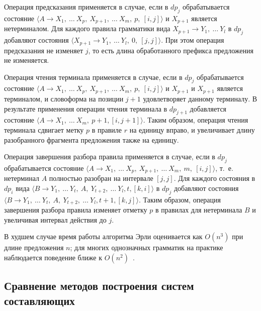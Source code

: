 Операция предсказания применяется в случае, если в $dp_j$ обрабатывается состояние $\langle A \rightarrow X_1,\ \ldots\ X_p,\ X_{p+1},\ \ldots\ X_m,\ p,\ [i, j]\rangle$ и $X_{p+1}$ является нетерминалом. Для каждого правила грамматики вида $X_{p+1} \rightarrow Y_1,\ \ldots\ Y_l$ в $dp_j$ добавляют состояния $\langle X_{p+1} \rightarrow Y_1,\ \ldots\ Y_l,\ 0,\ [j, j]\rangle$. При этом операция предсказания не изменяет $j$, то есть длина обработанного префикса предложения не изменяется.

Операция чтения терминала применяется в случае, если в $dp_j$ обрабатывается состояние $\langle A \rightarrow X_1,\ \ldots\ X_p,\ X_{p+1},\ \ldots\ X_m,\ p,\ [i, j]\rangle$ и $X_{p+1}$ и $X_{p+1}$ является терминалом, и словоформа на позиции $j+1$ удовлетворяет данному терминалу. В результате применения операции чтения терминала в $dp_{j+1}$ добавляется состояние $\langle A \rightarrow X_1,\ \ldots\ X_m,\ p+1, [i, j+1]\rangle$. Таким образом, операция чтения терминала сдвигает метку $p$ в правиле $r$ на единицу вправо, и увеличивает длину разобранного фрагмента предложения также на единицу.

Операция завершения разбора правила применяется в случае, если в $dp_j$ обрабатывается состояние $\langle A \rightarrow X_1,\ \ldots\ X_p,\ X_{p+1},\ \ldots\ X_m,\ m,\ [i, j]\rangle$, т.~е. нетерминал $A$ полностью разобран на интервале $[j, j]$. Для каждого состояния в $dp_i$ вида $\langle B \rightarrow Y_1,\ \ldots\ Y_{t},\ A,\ Y_{t+2},\ \ldots\ Y_l, t, [k, i] \rangle$ в $dp_j$ добавляют состояния $\langle B \rightarrow Y_1,\ \ldots\ Y_{t},\ A,\ Y_{t+2},\ \ldots\ Y_l, t+1, [k, j] \rangle$. Таким образом, операция завершения разбора правила изменяет отметку $p$ в правилах для нетерминала $B$ и увеличивая интервал действия до $j$.

В худшем случае время работы алгоритма Эрли оценивается как $O(n^3)$ при длине предложения $n$; для многих однозначных грамматик на практике наблюдается поведение ближе к $O(n^2)$~\cite{earley1970efficient,jurafsky2026speech}.

\subsection{Сравнение методов построения систем составляющих}

